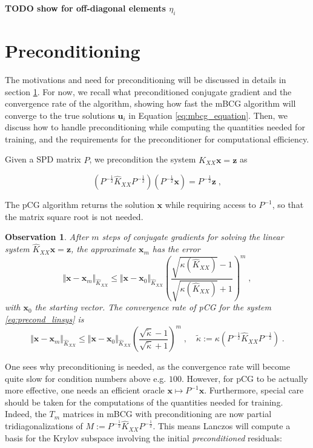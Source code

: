 \documentclass{article}
\newcommand{\vect}[1]{\boldsymbol{\mathbf{#1}}}
\newcommand{\norm}[1]{\Vert #1 \Vert}
\newtheorem{observation}[theorem]{Observation}
\begin{document}
\textbf{TODO show for off-diagonal elements $\eta_i$}

\section{Preconditioning}

The motivations and need for preconditioning will be discussed in details in section \ref{}. For now, we recall what preconditioned conjugate gradient and the convergence rate of the algorithm, showing how fast the mBCG algorithm will converge to the true solutions $\vect u_i$ in Equation \eqref{eq:mbcg_equation}. Then, we discuss how to handle preconditioning while computing the quantities needed for training, and the requirements for the preconditioner for computational efficiency.

Given a SPD matrix $P$, we precondition the system $\widehat K_{XX} \vect x = \vect z$ as

\begin{equation} \label{eq:precond_linsys}
    \left( P^{-\frac 1 2} \widehat K_{XX} P^{-\frac 1 2} \right) \left( P^{-\frac 1 2} \vect x\right) = P^{-\frac 1 2} \vect z \; ,
\end{equation}

The pCG algorithm returns the solution $\vect x$ while requiring access to $P^{-1}$, so that the matrix square root is not needed. 

\begin{observation}
After $m$ steps of conjugate gradients for solving the linear system $\widehat K_{XX} \vect x = \vect z$, the approximate $\vect x_m$ has the error
\begin{equation*}
    \norm{\vect x - \vect x_m}_{\widehat K_{XX}} \le \norm{\vect x - \vect x_0}_{\widehat K_{XX}} \left(  \frac{\sqrt{\kappa(\widehat K_{XX})} - 1}{\sqrt{ \kappa(\widehat K_{XX})} + 1} \right)^m \; ,
\end{equation*}
with $\vect x_0$ the starting vector. The convergence rate of pCG for the system \eqref{eq:precond_linsys} is
\begin{equation*}
    \norm{\vect x - \vect x_m}_{\widehat K_{XX}} \le \norm{\vect x - \vect x_0}_{\widehat K_{XX}}  \left( \frac{\sqrt{\tilde \kappa } - 1}{\sqrt{\tilde \kappa} + 1} \right)^m \; , \quad 
    \tilde \kappa := \kappa\left( P^{-\frac 1 2} \widehat K_{XX} P^{-\frac 1 2} \right) \; .
\end{equation*}
\end{observation}

One sees why preconditioning is needed, as the convergence rate will become quite slow for condition numbers above e.g. $100$. However, for pCG to be actually more effective, one needs an efficient oracle $\vect x \mapsto P^{-1} \vect x$. Furthermore, special care should be taken for the computations of the quantities needed for training. Indeed, the $T_m$ matrices in mBCG with preconditioning are now partial tridiagonalizations of $M := P^{-\frac 1 2} \widehat K_{XX} P^{-\frac 1 2}$. This means Lanczos will compute a basis for the Krylov subspace involving the initial \emph{preconditioned} residuals:
\end{document}
